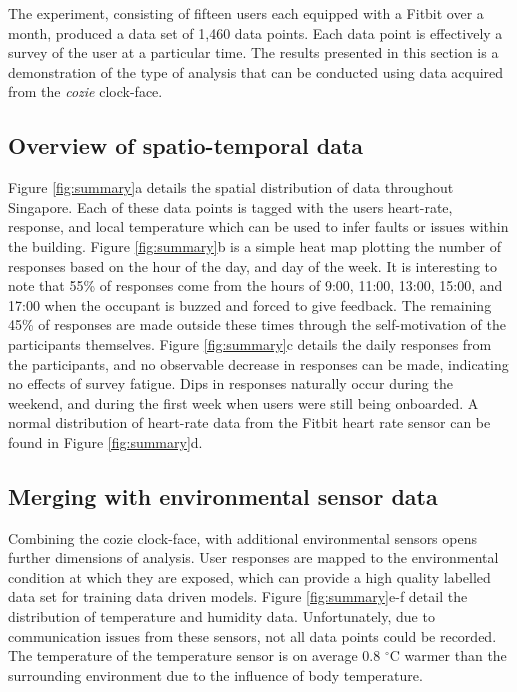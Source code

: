 
The experiment, consisting of fifteen users each equipped with a Fitbit over a month, produced a data set of 1,460 data points. Each data point is effectively a survey of the user at a particular time. The results presented in this section is a demonstration of the type of analysis that can be conducted using data acquired from the \emph{cozie} clock-face.

\subsection{Overview of spatio-temporal data}
Figure \ref{fig:summary}a details the spatial distribution of data throughout Singapore. Each of these data points is tagged with the users heart-rate, response, and local temperature which can be used to infer faults or issues within the building. Figure \ref{fig:summary}b is a simple heat map plotting the number of responses based on the hour of the day, and day of the week. It is interesting to note that 55\% of responses come from the hours of 9:00, 11:00, 13:00, 15:00, and 17:00 when the occupant is buzzed and forced to give feedback. The remaining 45\% of responses are made outside these times through the self-motivation of the participants themselves. Figure \ref{fig:summary}c details the daily responses from the participants, and no observable decrease in responses can be made, indicating no effects of survey fatigue. Dips in responses naturally occur during the weekend, and during the first week when users were still being onboarded. A normal distribution of heart-rate data from the Fitbit heart rate sensor can be found in Figure \ref{fig:summary}d.

\subsection{Merging with environmental sensor data}
Combining the cozie clock-face, with additional environmental sensors opens further dimensions of analysis. User responses are mapped to the environmental condition at which they are exposed, which can provide a high quality labelled data set for training data driven models. Figure \ref{fig:summary}e-f detail the distribution of temperature and humidity data. Unfortunately, due to communication issues from these sensors, not all data points could be recorded. The temperature of the temperature sensor is on average 0.8 $^\circ$C warmer than the surrounding environment due to the influence of body temperature. 

